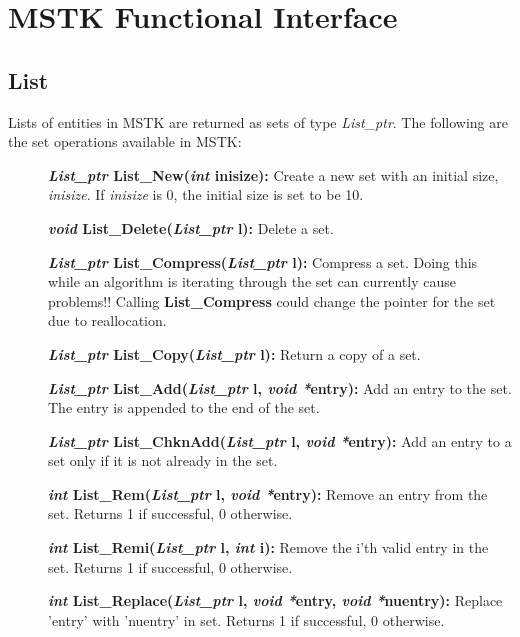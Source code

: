 \documentclass[12pt]{article}
\begin{document}
\newpage
\section{MSTK Functional Interface}
\subsection{List}

Lists of entities in MSTK are returned as sets of type
\textit{List\_ptr}. The following are the set operations available in
MSTK:

\begin{description}
\item[]\textbf{\textit{List\_ptr} List\_New(\textit{int} inisize):} Create a
new set with an initial size, \textit{inisize}. If \textit{inisize} is
0, the initial size is set to be 10.

\item[]\textbf{\textit{void} List\_Delete(\textit{List\_ptr} l):} Delete a set.

\item[]\textbf{\textit{List\_ptr} List\_Compress(\textit{List\_ptr} l):} Compress
a set.  Doing this while an algorithm is iterating through the set can
currently cause problems!! Calling \textbf{List\_Compress} could change the
pointer for the set due to reallocation.

\item[]\textbf{\textit{List\_ptr} List\_Copy(\textit{List\_ptr} l):} Return a
copy of a set.

\item[]\textbf{\textit{List\_ptr} List\_Add(\textit{List\_ptr} l, \textit{void
  *}entry):} Add an entry to the set. The entry is appended to the end
of the set.

\item[]\textbf{\textit{List\_ptr} List\_ChknAdd(\textit{List\_ptr} l,
\textit{void *}entry):} Add an entry to a set only if it is not already
in the set.

\item[]\textbf{\textit{int} List\_Rem(\textit{List\_ptr} l, \textit{void
  *}entry):} Remove an entry from the set. Returns 1 if successful, 0
otherwise.

\item[]\textbf{\textit{int} List\_Remi(\textit{List\_ptr} l, \textit{int} i):}
Remove the i'th valid entry in the set. Returns 1 if successful, 0
otherwise.

\item[]\textbf{\textit{int} List\_Replace(\textit{List\_ptr} l, \textit{void
  *}entry, \textit{void *}nuentry):} Replace 'entry' with 'nuentry' in
set. Returns 1 if successful, 0 otherwise.


\end{description}
\end{document}
